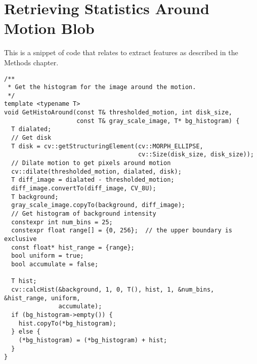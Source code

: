 \chapter{\label{ap:dilate}Retrieving Statistics Around Motion Blob}
This is a snippet of code that relates to extract features as described
in the Methods chapter. 
\begin{verbatim}
/**
 * Get the histogram for the image around the motion.
 */
template <typename T>
void GetHistoAround(const T& thresholded_motion, int disk_size,
                    const T& gray_scale_image, T* bg_histogram) {
  T dialated;
  // Get disk
  T disk = cv::getStructuringElement(cv::MORPH_ELLIPSE,
                                     cv::Size(disk_size, disk_size));
  // Dilate motion to get pixels around motion
  cv::dilate(thresholded_motion, dialated, disk);
  T diff_image = dialated - thresholded_motion;
  diff_image.convertTo(diff_image, CV_8U);
  T background;
  gray_scale_image.copyTo(background, diff_image);
  // Get histogram of background intensity
  constexpr int num_bins = 25;
  constexpr float range[] = {0, 256};  // the upper boundary is exclusive
  const float* hist_range = {range};
  bool uniform = true;
  bool accumulate = false;

  T hist;
  cv::calcHist(&background, 1, 0, T(), hist, 1, &num_bins, &hist_range, uniform,
               accumulate);
  if (bg_histogram->empty()) {
    hist.copyTo(*bg_histogram);
  } else {
    (*bg_histogram) = (*bg_histogram) + hist;
  }
}
\end{verbatim}
